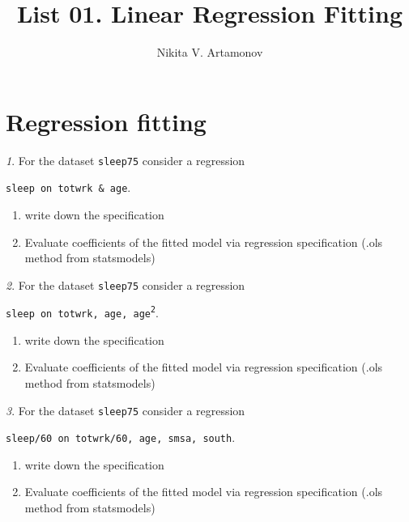\documentclass[12pt]{article}
\title{List 01. Linear Regression Fitting}
\author{Nikita V. Artamonov}
\theoremstyle{remark}
\newtheorem{problem}{}[section]
\begin{document}
\maketitle

\tableofcontents

\section{Regression fitting}

\begin{problem}
For the dataset \texttt{sleep75} consider a regression
\begin{center}
	\texttt{sleep on totwrk \& age}.
\end{center}
\begin{enumerate}
	\item write down the specification
	\item Evaluate coefficients of the fitted model via 
	regression specification (.ols method from statsmodels)
\end{enumerate}
\end{problem}

\begin{problem}
For the dataset \texttt{sleep75} consider a regression
\begin{center}
	\texttt{sleep on totwrk, age, age\textsuperscript{2}}.
\end{center}
\begin{enumerate}
	\item write down the specification
	\item Evaluate coefficients of the fitted model via 
	regression specification (.ols method from statsmodels)
\end{enumerate}
\end{problem}

\begin{problem}
For the dataset \texttt{sleep75} consider a regression
\begin{center}
	\texttt{sleep/60 on totwrk/60, age, smsa, south}.
\end{center}
\begin{enumerate}
	\item write down the specification
	\item Evaluate coefficients of the fitted model via 
	regression specification (.ols method from statsmodels)
\end{enumerate}
\end{problem}
\end{document}
